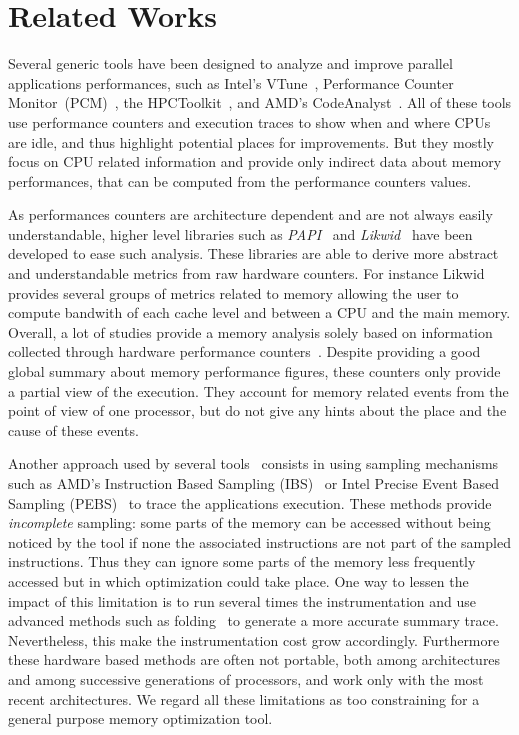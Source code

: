 
\section{Related Works}
\label{sec:related}

Several generic tools have been designed to analyze and improve parallel
applications performances, such as Intel's VTune~\cite{Reinders05VTune},
Performance Counter Monitor~(PCM)~\cite{Intel2012b}, the
HPCToolkit~\cite{Adhianto10HPCTOOLKIT}, and AMD's
CodeAnalyst~\cite{Drongowski2008}. All of these tools use performance
counters and execution traces to show when and where CPUs are idle, and thus
highlight potential places for improvements.
But they mostly focus on CPU related information and provide only
indirect data about memory performances, that can be computed from the performance counters values.

As performances counters are architecture dependent and are not always easily
understandable, higher level libraries such as \emph{PAPI}~\cite{Weaver13PAPI} and
\emph{Likwid}~\cite{Treibig10LIKWID} have been developed to ease such analysis. These
libraries are able to derive more abstract and understandable metrics from raw hardware counters.
For instance Likwid provides several groups of metrics related to memory
allowing the user to compute bandwith of each cache level and between a CPU
and the main memory.
Overall, a lot of studies provide a memory analysis solely based
on information collected through hardware performance counters~\cite{Majo13(Mis)understanding,
Jiang14Understanding,Bosch00Rivet,Weyers14Visualization,Tao01Visualizing,DeRose01Hardware}.
Despite providing a good global summary about memory performance figures, these counters only provide a partial view of the execution. They
account for memory related events from the point of view of one processor, but do not give any hints about the place and the cause of these events.

Another approach used by several
tools~\cite{Lachaize12MemProf,McCurdy10Memphis,Liu14Tool,Gimenez14Dissecting}
consists in using sampling mechanisms such as AMD's Instruction Based Sampling
(IBS)~\cite{Drongowski07Instructionbased} or Intel Precise Event Based
Sampling (PEBS)~\cite{Levinthal2009} to trace the applications execution. These methods
provide \emph{incomplete} sampling: some parts of the memory can be accessed without
being noticed by the tool if none the associated instructions are not part of the sampled
instructions.
Thus they can ignore some parts of the memory less frequently accessed but in which
optimization could take place.
One way to lessen the impact of this limitation is to run several times the
instrumentation and use advanced methods such as
folding~\cite{Servat15Towards} to generate a more accurate summary trace.
Nevertheless, this make the instrumentation cost grow accordingly.
Furthermore
these hardware based methods are often not portable, both among architectures and
among successive generations of processors, and work only with the most
recent architectures.
We regard all these limitations as too constraining for a general purpose memory optimization tool.

